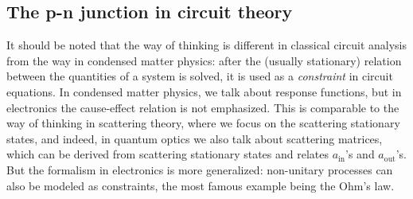 \documentclass[hyperref, a4paper]{article}
\begin{document}
\subsection{The p-n junction in circuit theory}

It should be noted that the way of thinking is different in classical circuit analysis
from the way in condensed matter physics:
after the (usually stationary) relation between the quantities of a system is solved,
it is used as a \emph{constraint} 
in circuit equations.
In condensed matter physics, we talk about response functions,
but in electronics the cause-effect relation is not emphasized.
This is comparable to the way of thinking in scattering theory,
where we focus on the scattering stationary states,
and indeed, in quantum optics we also talk about scattering matrices,
which can be derived from scattering stationary states 
and relates $a_{\text{in}}$'s and $a_{\text{out}}$'s.
But the formalism in electronics is more generalized:
non-unitary processes can also be modeled as constraints,
the most famous example being the Ohm's law.
\end{document}
